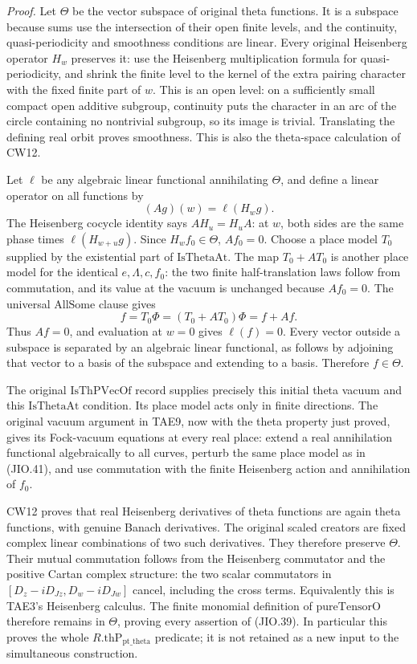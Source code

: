 \emph{Proof.}
Let \(\Theta\) be the vector subspace of original theta functions.
It is a subspace because sums use the intersection of their open
finite levels, and the continuity, quasi-periodicity and smoothness
conditions are linear.  Every original Heisenberg operator \(H_w\)
preserves it: use the Heisenberg multiplication formula for
quasi-periodicity, and shrink the finite level to the kernel of
the extra pairing character with the fixed finite part of \(w\).
This is an open level: on a sufficiently small compact open
additive subgroup, continuity puts the character in an arc of
the circle containing no nontrivial subgroup, so its image is
trivial.  Translating the defining real orbit proves smoothness.
This is also the theta-space calculation of CW12.

Let \(\ell\) be any algebraic linear functional annihilating
\(\Theta\), and define a linear operator on all functions by
\[
                       (Ag)(w)=\ell(H_wg).
 \tag{JIO.40}
\]
The Heisenberg cocycle identity says
\(AH_u=H_uA\): at \(w\), both sides are the same phase times
\(\ell(H_{w+u}g)\).  Since \(H_wf_0\in\Theta\), \(Af_0=0\).
Choose a place model \(T_0\) supplied by the existential part of
\(\mathrm{IsThetaAt}\).  The map \(T_0+AT_0\) is another place
model for the identical \(e,\Lambda,c,f_0\): the two finite
half-translation laws follow from commutation, and its value at
the vacuum is unchanged because \(Af_0=0\).
The universal \(\mathrm{AllSome}\) clause gives
\[
                 f=T_0\Phi=(T_0+AT_0)\Phi=f+Af.
 \tag{JIO.41}
\]
Thus \(Af=0\), and evaluation at \(w=0\) gives \(\ell(f)=0\).
Every vector outside a subspace is separated by an algebraic
linear functional, as follows by adjoining that vector to a
basis of the subspace and extending to a basis.  Therefore
\(f\in\Theta\).

The original \(\mathrm{IsThPVecOf}\) record supplies precisely
this initial theta vacuum and this \(\mathrm{IsThetaAt}\)
condition.  Its place model acts only in finite directions.
The original vacuum argument in TAE9, now with the theta property
just proved, gives its Fock-vacuum equations at every real place:
extend a real annihilation functional algebraically to all
curves, perturb the same place model as in (JIO.41), and use
commutation with the finite Heisenberg action and annihilation
of \(f_0\).

CW12 proves that real Heisenberg derivatives of theta functions
are again theta functions, with genuine Banach derivatives.
The original scaled creators are fixed complex linear
combinations of two such derivatives.  They therefore preserve
\(\Theta\).  Their mutual commutation follows from the
Heisenberg commutator and the positive Cartan complex structure:
the two scalar commutators in
\([D_z-iD_{Jz},D_w-iD_{Jw}]\) cancel, including the cross terms.
Equivalently this is TAE3's Heisenberg calculus.
The finite monomial definition of \(\mathrm{pureTensorO}\)
therefore remains in \(\Theta\), proving every assertion of
(JIO.39).  In particular this proves the whole
\(R.\mathrm{thP}_{\mathrm{pt\_theta}}\) predicate; it is not
retained as a new input to the simultaneous construction.

